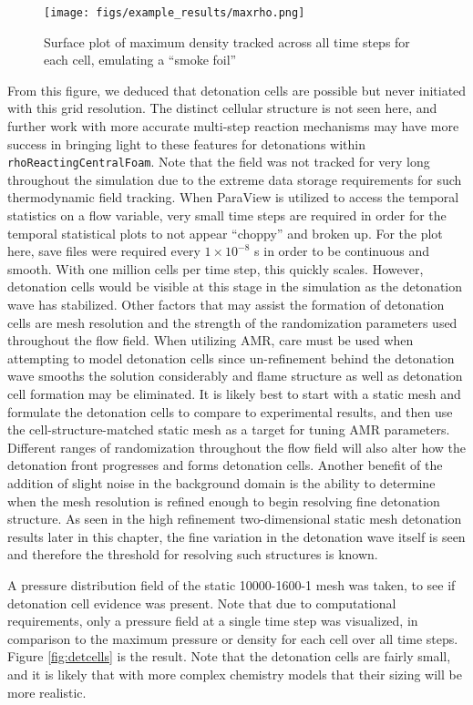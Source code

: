 \begin{figure}[b!]
\centering
\texttt{[image: figs/example\_results/maxrho.png]}
\caption{Surface plot of maximum density tracked across all time steps for each cell, emulating a ``smoke foil''}
\label{fig:maxrho}
\end{figure}

From this figure, we deduced that detonation cells are possible but never initiated with this grid resolution. The distinct cellular structure is not seen here, and further work with more accurate multi-step reaction mechanisms may have more success in bringing light to these features for detonations within \verb|rhoReactingCentralFoam|. Note that the field was not tracked for very long throughout the simulation due to the extreme data storage requirements for such thermodynamic field tracking. When ParaView is utilized to access the temporal statistics on a flow variable, very small time steps are required in order for the temporal statistical plots to not appear ``choppy'' and broken up. For the plot here, save files were required every \(1 \times 10^{ - 8}\) s in order to be continuous and smooth. With one million cells per time step, this quickly scales. However, detonation cells would be visible at this stage in the simulation as the detonation wave has stabilized. Other factors that may assist the formation of detonation cells are mesh resolution and the strength of the randomization parameters used throughout the flow field. When utilizing AMR, care must be used when attempting to model detonation cells since un-refinement behind the detonation wave smooths the solution considerably and flame structure as well as detonation cell formation may be eliminated. It is likely best to start with a static mesh and formulate the detonation cells to compare to experimental results, and then use the cell-structure-matched static mesh as a target for tuning AMR parameters. Different ranges of randomization throughout the flow field will also alter how the detonation front progresses and forms detonation cells. Another benefit of the addition of slight noise in the background domain is the ability to determine when the mesh resolution is refined enough to begin resolving fine detonation structure. As seen in the high refinement two-dimensional static mesh detonation results later in this chapter, the fine variation in the detonation wave itself is seen and therefore the threshold for resolving such structures is known. 

A pressure distribution field of the static 10000-1600-1 mesh was taken, to see if detonation cell evidence was present. Note that due to computational requirements, only a pressure field at a single time step was visualized, in comparison to the maximum pressure or density for each cell over all time steps. Figure \ref{fig:detcells} is the result. Note that the detonation cells are fairly small, and it is likely that with more complex chemistry models that their sizing will be more realistic.

